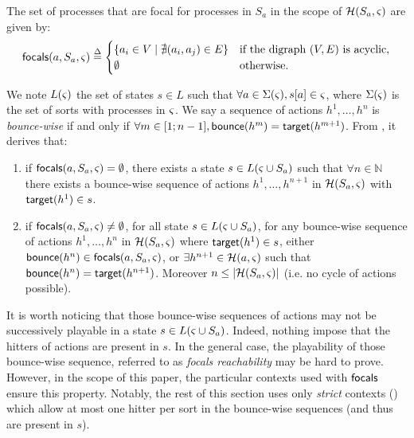 \begin{definition}\label{def:focals}
The set of processes that are focal for processes in $S_a$ in the scope of $\mathcal{H}(S_a,\varsigma)$
are given by:
\[
\mathsf{focals}(a,S_a,\varsigma) \stackrel{\Delta}=
\begin{cases}
\{ a_i \in V \mid \nexists (a_i,a_j)\in E\} & \text{if the digraph $(V,E)$ is acyclic},\\
\emptyset & \text{otherwise.}\\
\end{cases}
\]
\end{definition}

We note $L(\varsigma)$ the set of states $s\in L$ such that $\forall a\in\Sigma(\varsigma), {s[a]}\in\varsigma$,
where $\Sigma(\varsigma)$ is the set of sorts with processes in $\varsigma$.
We say a sequence of actions $h^1,\dots,h^n$ is \emph{bounce-wise} if and only if
$\forall m\in[1;n-1], \mathsf{bounce}(h^m)=\mathsf{target}(h^{m+1})$.
From , it derives that:
\begin{enumerate}
\item if $\mathsf{focals}(a,S_a,\varsigma)=\emptyset$, there exists a 
state $s\in L(\varsigma\cup S_a)$ such that $\forall n\in\mathbb N$ there
exists a bounce-wise sequence of actions $h^1,\dots,h^{n+1}$ in $\mathcal{H}(S_a,\varsigma)$ 
with $\mathsf{target}(h^1)\in s$.
\item if $\mathsf{focals}(a,S_a,\varsigma)\neq\emptyset$, for all
state $s\in L(\varsigma\cup S_a)$,
for any bounce-wise sequence of actions $h^1,\dots,h^n$ in $\mathcal{H}(S_a,\varsigma)$ where $\mathsf{target}(h^1)\in
s$,
either
 $\mathsf{bounce}(h^n) \in \mathsf{focals}(a,S_a,\varsigma)$,
or
$\exists h^{n+1}\in \mathcal{H}(a,\varsigma)$ such that $\mathsf{bounce}(h^n) = \mathsf{target}(h^{n+1})$.
Moreover $n\leq|\mathcal{H}(S_a,\varsigma)|$ (i.e. no cycle of actions possible).
\end{enumerate}

It is worth noticing that those bounce-wise sequences of actions may not be successively playable in
a state $s\in L(\varsigma\cup S_a)$.
Indeed, nothing impose that the hitters of actions are present in $s$.
In the general case, the playability of those bounce-wise sequence, referred to as \emph{focals
reachability} may be hard to prove.
However, in the scope of this paper, the particular contexts used with $\mathsf{focals}$ ensure this property.
Notably, the rest of this section uses only \emph{strict} contexts () which
allow at most one hitter per sort in the bounce-wise sequences (and thus are present in $s$).

